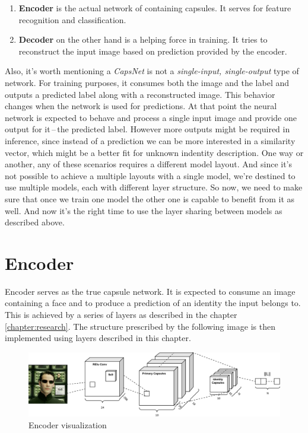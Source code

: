 \begin{enumerate}
    \item \textbf{Encoder} is the actual network of containing capsules. It serves for feature recognition and classification.
    \item \textbf{Decoder} on the other hand is a helping force in training. It tries to reconstruct the input image based on prediction provided by the encoder.
\end{enumerate}

Also, it's worth mentioning a \textit{CapsNet} is not a \textit{single-input, single-output} type of network. For training purposes, it consumes both the image and the label and outputs a predicted label along with a reconstructed image. This behavior changes when the network is used for predictions. At that point the neural network is expected to behave and process a single input image and provide one output for it\,--\,the predicted label. However more outputs might be required in inference, since instead of a prediction we can be more interested in a similarity vector, which might be a better fit for unknown indentity description. One way or another, any of these scenarios requires a different model layout. And since it's not possible to achieve a multiple layouts with a single model, we're destined to use multiple models, each with different layer structure. So now, we need to make sure that once we train one model the other one is capable to benefit from it as well. And now it's the right time to use the layer sharing between models as described above.

\section{Encoder}

Encoder serves as the true capsule network. It is expected to consume an image containing a face and to produce a prediction of an identity the input belongs to. This is achieved by a series of layers as described in the chapter \ref{chapter:research}. The structure prescribed by the following image is then implemented using layers described in this chapter.

\begin{figure}[ht!]
    \centering
    \includegraphics[width=\textwidth]{obrazky-figures/my_capsnet_encoder.pdf}
    \caption{Encoder visualization}
    \label{fig:my_encoder}
\end{figure}

